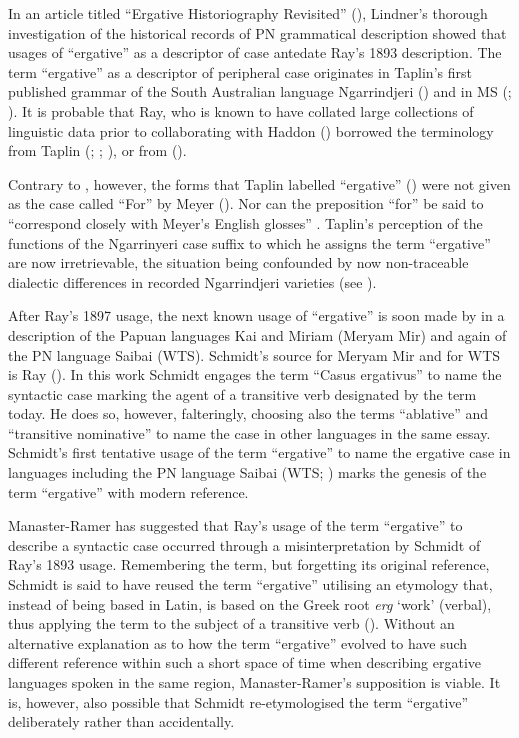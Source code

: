 In an article titled “Ergative Historiography Revisited” (\citeyear{lindner_ergative_2014}), Lindner’s thorough investigation of the historical records of PN grammatical description showed that usages of “ergative” as a descriptor of case antedate Ray’s 1893 description. The term “ergative” as a descriptor of peripheral case originates in Taplin’s first published grammar of the South Australian language Ngarrindjeri (\citeyear{taplin_notes_1872}) and in MS (\citeyear{taplin_notes_1870}; \citealt[188--189]{lindner_ergative_2014}). It is probable that Ray, who is known to have collated large collections of linguistic data prior to collaborating with Haddon (\citealt[183]{shnukal_at_1998}) borrowed the terminology from Taplin (\citeyear{taplin_notes_1872}; \citeyear{taplin_native_1874}; \citeyear{taplin_1879a_nodate}), or from \citet{thomas_succinct_1878} ().

Contrary to \citet[189]{lindner_ergative_2014}, however, the forms that Taplin labelled “ergative” () were not given as the case called “For” by Meyer (). Nor can the preposition “for” be said to “correspond closely with Meyer’s English glosses” \citep[190]{lindner_ergative_2014}. Taplin’s perception of the functions of the Ngarrinyeri case suffix to which he assigns the term “ergative” are now irretrievable, the situation being confounded by now non-traceable dialectic differences in recorded Ngarrindjeri varieties (see \citealt[364--368]{stockigt_early_2015}).

After Ray’s 1897 usage, the next known usage of “ergative” is soon made by \citet[88]{schmidt_sprachlichen_1902} in a description of the Papuan languages Kai and Miriam (Meryam Mir) and again of the PN language Saibai (WTS). Schmidt’s source for Meryam Mir and for WTS is Ray (\citealt[211]{manaster-ramer_origin_1994}). In this work Schmidt engages the term “Casus ergativus” to name the syntactic case marking the agent of a transitive verb designated by the term today. He does so, however, falteringly, choosing also the terms “ablative” and “transitive nominative” to name the case in other languages in the same essay. Schmidt’s first tentative usage of the term “ergative” to name the ergative case in languages including the PN language Saibai (WTS; \citeyear{schmidt_sprachlichen_1902}) marks the genesis of the term “ergative” with modern reference. 

Manaster-Ramer has suggested that Ray’s usage of the term “ergative” to describe a syntactic case occurred through a misinterpretation by Schmidt of Ray’s 1893 usage. Remembering the term, but forgetting its original reference, Schmidt is said to have reused the term “ergative” utilising an etymology that, instead of being based in Latin, is based on the Greek root \textit{erg} `work' (verbal), thus applying the term to the subject of a transitive verb (\citealt[213]{manaster-ramer_origin_1994}). Without an alternative explanation as to how the term “ergative” evolved to have such different reference within such a short space of time when describing ergative languages spoken in the same region, Manaster-Ramer’s supposition is viable. It is, however, also possible that Schmidt re-etymologised the term “ergative” deliberately rather than accidentally.

